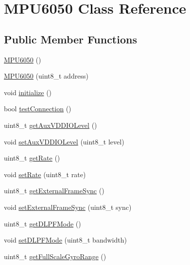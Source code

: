 \hypertarget{class_m_p_u6050}{}\section{M\+P\+U6050 Class Reference}
\label{class_m_p_u6050}
\subsection*{Public Member Functions}
\begin{DoxyCompactItemize}
\item 
\mbox{\hyperlink{class_m_p_u6050_a7c0146d45537e4bd7a0d4c1c476fdab7}{M\+P\+U6050}} ()
\item 
\mbox{\hyperlink{class_m_p_u6050_a94df4ec1565317ba5279122b3bf7e056}{M\+P\+U6050}} (uint8\+\_\+t address)
\item 
void \mbox{\hyperlink{class_m_p_u6050_abd8fc6c18adf158011118fbccc7e7054}{initialize}} ()
\item 
bool \mbox{\hyperlink{class_m_p_u6050_a95ffab7b44fce3834236e0813687d11a}{test\+Connection}} ()
\item 
uint8\+\_\+t \mbox{\hyperlink{class_m_p_u6050_af6e9af8e2222889fd5458e2ae12c55c8}{get\+Aux\+V\+D\+D\+I\+O\+Level}} ()
\item 
void \mbox{\hyperlink{class_m_p_u6050_a7c666c20e26869bc80646f1b2c3d69bc}{set\+Aux\+V\+D\+D\+I\+O\+Level}} (uint8\+\_\+t level)
\item 
uint8\+\_\+t \mbox{\hyperlink{class_m_p_u6050_a887a173e079980505763ffd1aa9fec05}{get\+Rate}} ()
\item 
void \mbox{\hyperlink{class_m_p_u6050_a7d03801d6b656e8e12cd3c1dd97824a8}{set\+Rate}} (uint8\+\_\+t rate)
\item 
uint8\+\_\+t \mbox{\hyperlink{class_m_p_u6050_a902a7d486cd6ac21f8c378634dc6f59a}{get\+External\+Frame\+Sync}} ()
\item 
void \mbox{\hyperlink{class_m_p_u6050_a77b36f41c531a11b5a835fc75a9aefe6}{set\+External\+Frame\+Sync}} (uint8\+\_\+t sync)
\item 
uint8\+\_\+t \mbox{\hyperlink{class_m_p_u6050_a9f2737fe22955fd85b2575ba8da874c6}{get\+D\+L\+P\+F\+Mode}} ()
\item 
void \mbox{\hyperlink{class_m_p_u6050_a7a782ade8af2f88dfef7171487f59a3b}{set\+D\+L\+P\+F\+Mode}} (uint8\+\_\+t bandwidth)
\item 
uint8\+\_\+t \mbox{\hyperlink{class_m_p_u6050_acb1fa088d43d76230106a3226f343013}{get\+Full\+Scale\+Gyro\+Range}} ()
\item 

\end{DoxyCompactItemize}
